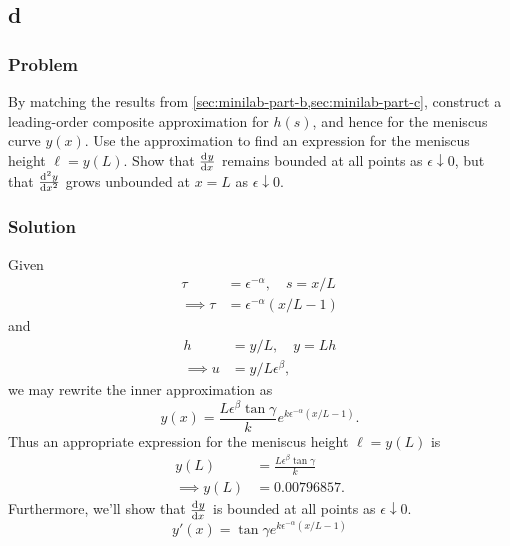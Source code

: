 \documentclass[12pt,twoside]{article}
\begin{document}
\subsection{d}
\label{sec:minilab-part-d}
\subsubsection*{Problem}
By matching the results from \cref{sec:minilab-part-b,sec:minilab-part-c},
construct a leading-order composite approximation for $h(s)$, and hence for the
meniscus curve $y(x)$. Use the approximation to find an expression for the
meniscus height $\ell=y(L)$. Show that $\od{y}{x}$ remains bounded at all
points as $\epsilon\downarrow0$, but that $\od[2]{y}{x}$ grows unbounded at
$x=L$ as $\epsilon\downarrow0$.
\subsubsection*{Solution}
Given
\begin{equation*}
  \begin{aligned}
    \tau &= \epsilon^{-\alpha},\quad s=x/L \\
    \implies \tau &= \epsilon^{-\alpha}(x/L-1)
  \end{aligned}
\end{equation*}
and
\begin{equation*}
  \begin{aligned}
    h &= y/L,\quad y=Lh \\
    \implies u &= y/L\epsilon^{\beta},
  \end{aligned}
\end{equation*}
we may rewrite the inner approximation as
\begin{equation*}
  y(x) = \frac{L\epsilon^{\beta}\tan\gamma}{k}e^{k\epsilon^{-\alpha}(x/L-1)}.
\end{equation*}
Thus an appropriate expression for the meniscus height $\ell=y(L)$ is
\begin{equation*}
  \begin{aligned}
    y(L) &= \frac{L\epsilon^{\beta}\tan\gamma}{k} \\
    \implies y(L) &= 0.00796857.
  \end{aligned}
\end{equation*}
Furthermore, we'll show that $\od{y}{x}$ is bounded at all points as
$\epsilon\downarrow0$.
\begin{equation*}
  y'(x) = \tan\gamma e^{k\epsilon^{-\alpha}(x/L-1)}
\end{equation*}
\end{document}
